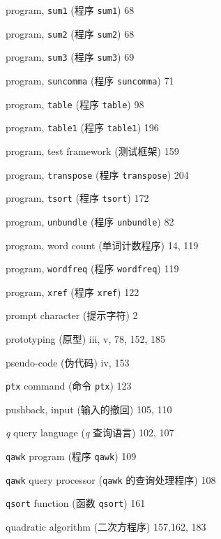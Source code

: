 \begin{multicols}{3}
\hangindent=3pc  program, \verb'sum1'  (程序 \verb'sum1') 68

\hangindent=3pc  program, \verb'sum2'  (程序 \verb'sum2') 68

\hangindent=3pc  program, \verb'sum3'  (程序 \verb'sum3') 69

\hangindent=3pc  program, \verb'suncomma' (程序 \verb'suncomma') 71

\hangindent=3pc  program, \verb'table' (程序 \verb'table') 98

\hangindent=3pc  program, \verb'table1' (程序 \verb'table1') 196

\hangindent=3pc  program, test framework (测试框架) 159

\hangindent=3pc  program, \verb'transpose' (程序
\verb'transpose') 204

\hangindent=3pc  program, \verb'tsort' (程序 \verb'tsort') 172

\hangindent=3pc  program, \verb'unbundle' (程序
\verb'unbundle') 82

\hangindent=3pc  program, word count (单词计数程序) 14, 119

\hangindent=3pc  program, \verb'wordfreq' (程序
\verb'wordfreq') 119

\hangindent=3pc  program, \verb'xref' (程序 \verb'xref') 122

\hangindent=3pc  prompt character (提示字符) 2

\hangindent=3pc  prototyping (原型) iii, v, 78, 152, 185

\hangindent=3pc  pseudo-code (伪代码) iv, 153

\hangindent=3pc  \verb'ptx' command (命令 \verb'ptx') 123

\hangindent=3pc  pushback, input (输入的撤回) 105, 110

\hangindent=3pc  \textit{q} query language (\textit{q}
查询语言) 102, 107

\hangindent=3pc  \verb'qawk' program (程序 \verb'qawk') 109

\hangindent=3pc  \verb'qawk' query processor (\verb'qawk'
的查询处理程序) 108

\hangindent=3pc  \verb'qsort' function (函数 \verb'qsort') 161

\hangindent=3pc  quadratic algorithm (二次方程序) 157,162, 183


\end{multicols}
